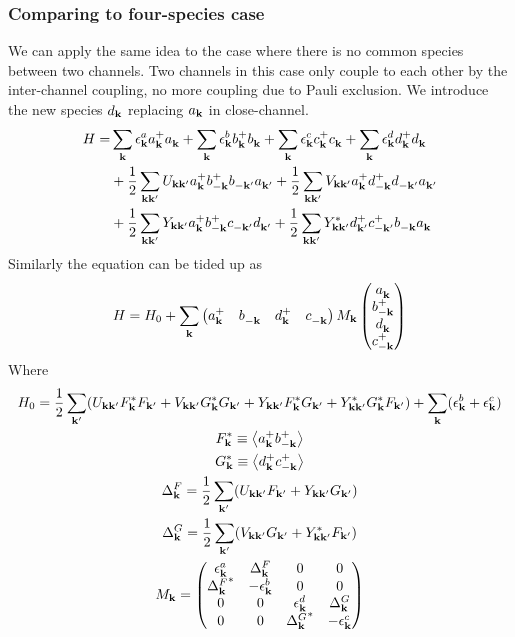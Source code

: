 \subsubsection{Comparing to four-species case}
We can apply the same idea to the case where there is no common species between two channels.   Two channels in this case only couple to each other by the inter-channel coupling, no more coupling due to Pauli exclusion.  We introduce the new species $d_{\mathbf{k}}$ replacing $a_{\mathbf{k}}$ in close-channel.  
\begin{equation}
\begin{split}
 H=&\sum_{\mathbf{k}}\epsilon^a_{\mathbf{k}}{}a^+_{\mathbf{k}}{}a^{}_{\mathbf{k}}+\sum_{\mathbf{k}}\epsilon^b_{\mathbf{k}}{}b^+_{\mathbf{k}}{}b^{}_{\mathbf{k}}
 	+\sum_{\mathbf{k}}\epsilon^c_{\mathbf{k}}{}c^+_{\mathbf{k}}{}c^{}_{\mathbf{k}}+\sum_{\mathbf{k}}\epsilon^d_{\mathbf{k}}{}d^+_{\mathbf{k}}{}d^{}_{\mathbf{k}}\\
  &+\frac{1}{2}\sum_{\mathbf{k}\mathbf{k}'}U_{\mathbf{k}\mathbf{k}'}a^+_{\mathbf{k}}{}b^+_{-\mathbf{k}}{}b^{}_{-\mathbf{k}'}a^{}_{\mathbf{k}'}
	+\frac{1}{2}\sum_{\mathbf{k}\mathbf{k}'}V_{\mathbf{k}\mathbf{k}'}a^+_{\mathbf{k}}{}d^+_{-\mathbf{k}}{}d^{}_{-\mathbf{k}'}a^{}_{\mathbf{k}'}\\
 &+\frac{1}{2}\sum_{\mathbf{k}\mathbf{k}'}Y_{\mathbf{k}\mathbf{k}'}a^+_{\mathbf{k}}{}b^+_{-\mathbf{k}}{}c^{}_{-\mathbf{k}'}d^{}_{\mathbf{k}'}
	+\frac{1}{2}\sum_{\mathbf{k}\mathbf{k}'}Y^*_{\mathbf{k}\mathbf{k}'}d^+_{\mathbf{k}'}{}c^+_{-\mathbf{k}'}{}b^{}_{-\mathbf{k}}a^{}_{\mathbf{k}}
\end{split} 
\end{equation}
Similarly the equation can be tided up as 
\begin{equation}
H=H_{0}+\sum_{\mathbf{k}}\begin{pmatrix}a^{+}_{\mathbf{k}}&b^{}_{-\mathbf{k}}&d^{+}_{\mathbf{k}}&c^{}_{-\mathbf{k}}\end{pmatrix}
M_{\mathbf{k}}
  \begin{pmatrix}a^{}_{\mathbf{k}}\\b^{+}_{-\mathbf{k}}\\d^{}_{\mathbf{k}}\\c^{+}_{-\mathbf{k}}\end{pmatrix}
\end{equation}
Where 
\begin{gather}
H_{0}=\frac{1}{2}\sum_{\mathbf{k}'}(U_{\mathbf{k}\mathbf{k}'}F_{\mathbf{k}}^{*}F_{\mathbf{k}'}+V_{\mathbf{k}\mathbf{k}'}G_{\mathbf{k}}^{*}G_{\mathbf{k}'}
 +Y_{\mathbf{k}\mathbf{k}'}F_{\mathbf{k}}^{*}G_{\mathbf{k}'}+Y^*_{\mathbf{k}\mathbf{k}'}G_{\mathbf{k}}^{*}F_{\mathbf{k}'})+\sum_{\mathbf{k}}(\epsilon^{b}_{\mathbf{k}}+\epsilon^{c}_{\mathbf{k}})\\
 F^{*}_{\mathbf{k}}\equiv\bigl<{a^+_{\mathbf{k}}{}b^+_{-\mathbf{k}}{}}\bigr>\\
 G^{*}_{\mathbf{k}}\equiv\bigl<{d^+_{\mathbf{k}}{}c^+_{-\mathbf{k}}{}}\bigr>\\
 \Delta^{F}_{\mathbf{k}}=\frac{1}{2}\sum_{\mathbf{k}'}(U_{\mathbf{k}\mathbf{k}'}F_{\mathbf{k}'}+Y_{\mathbf{k}\mathbf{k}'}G_{\mathbf{k}'})\\
  \Delta^{G}_{\mathbf{k}}=\frac{1}{2}\sum_{\mathbf{k}'}(V_{\mathbf{k}\mathbf{k}'}G_{\mathbf{k}'}+Y^{*}_{\mathbf{k}\mathbf{k}'}F_{\mathbf{k}'})\\
  M_{\mathbf{k}}=\begin{pmatrix}
  \epsilon^{a}_{\mathbf{k}}&\Delta^{F}_{\mathbf{k}}&0&0\\
  {\Delta^{F}_{\mathbf{k}}}^{*}&-\epsilon^{b}_{\mathbf{k}}&0&0\\
   0&0&\epsilon^{d}_{\mathbf{k}}&\Delta^{G}_{\mathbf{k}}\\
   0&0&{\Delta^{G}_{\mathbf{k}}}^{*}&-\epsilon^{c}_{\mathbf{k}}\\
  \end{pmatrix}
\end{gather}
